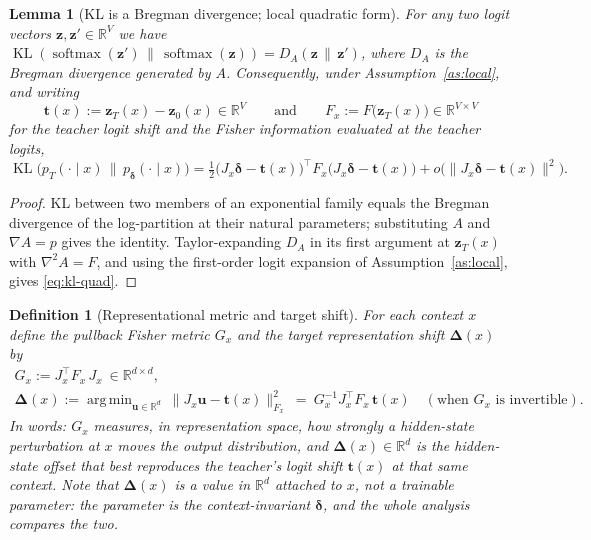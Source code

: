 \documentclass[11pt]{article}
\newtheorem{definition}{Definition}[section]
\newtheorem{lemma}{Lemma}[section]
\DeclareMathOperator{\KL}{KL}
\DeclareMathOperator{\softmax}{softmax}
\DeclareMathOperator*{\argmin}{arg\,min}
\newcommand{\R}{\mathbb{R}}
\newcommand{\bz}{\mathbf{z}}
\newcommand{\bt}{\mathbf{t}}
\newcommand{\bu}{\mathbf{u}}
\newcommand{\bdelta}{\bm{\delta}}
\newcommand{\bDelta}{\bm{\Delta}}
\begin{document}
\begin{lemma}[KL is a Bregman divergence; local quadratic form]\label{lem:bregman}
For any two logit vectors $\bz,\bz'\in\R^V$ we have
$\KL(\softmax(\bz')\,\|\,\softmax(\bz))=D_A(\bz\,\|\,\bz')$, where $D_A$ is the Bregman divergence
generated by $A$. Consequently, under Assumption~\ref{as:local}, and writing
\begin{equation*}
\bt(x):=\bz_T(x)-\bz_0(x)\in\R^V
\qquad\text{and}\qquad
F_x:=F\big(\bz_T(x)\big)\in\R^{V\times V}
\end{equation*}
for the teacher logit shift and the Fisher information evaluated at the teacher logits,
\begin{equation}\label{eq:kl-quad}
\KL\!\big(p_T(\cdot\mid x)\,\|\,p_{\bdelta}(\cdot\mid x)\big)
=\tfrac12\big(J_x\bdelta-\bt(x)\big)^\top F_x\big(J_x\bdelta-\bt(x)\big)
   +o\big(\|J_x\bdelta-\bt(x)\|^2\big).
\end{equation}
\end{lemma}
\begin{proof}
KL between two members of an exponential family equals the Bregman divergence of the log-partition
at their natural parameters; substituting $A$ and $\nabla A=p$ gives the identity. Taylor-expanding
$D_A$ in its first argument at $\bz_T(x)$ with $\nabla^2 A=F$, and using the first-order logit
expansion of Assumption~\ref{as:local}, gives \eqref{eq:kl-quad}.
\end{proof}

\begin{definition}[Representational metric and target shift]\label{def:metric}
For each context $x$ define the \emph{pullback Fisher metric} $G_x$ and the \emph{target
representation shift} $\bDelta(x)$ by
\begin{equation*}
\begin{gathered}
G_x:=J_x^\top F_x\,J_x\ \in\R^{d\times d},\\[2pt]
\bDelta(x):=\argmin_{\bu\in\R^d}\ \|J_x\bu-\bt(x)\|_{F_x}^2
\ =\ G_x^{-1}J_x^\top F_x\,\bt(x)\quad(\text{when }G_x\text{ is invertible}).
\end{gathered}
\end{equation*}
In words: $G_x$ measures, in representation space, how strongly a hidden-state perturbation at $x$
moves the output distribution, and $\bDelta(x)\in\R^d$ is the hidden-state offset that best
reproduces the teacher's logit shift $\bt(x)$ at that same context. Note that $\bDelta(x)$ is a
\emph{value} in $\R^d$ attached to $x$, not a trainable parameter: the parameter is the
context-invariant $\bdelta$, and the whole analysis compares the two.
\end{definition}
\end{document}
